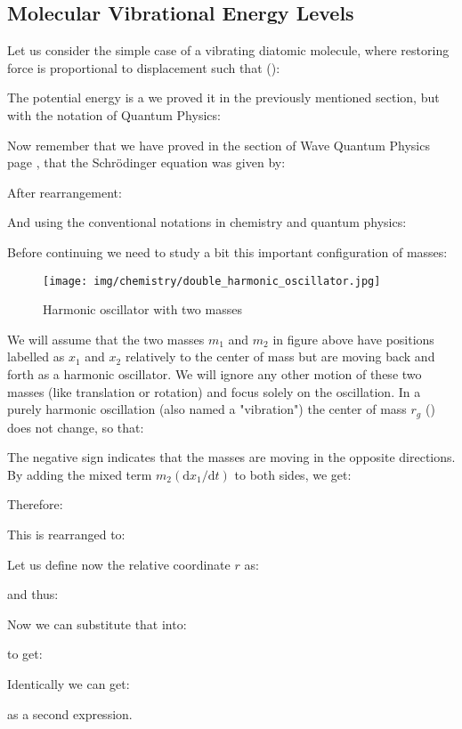 	\pagebreak
	\subsection{Molecular Vibrational Energy Levels}\label{molecular vibrations}
	Let us consider the simple case of a vibrating diatomic molecule, where restoring force is proportional to displacement such that ():
	
	The potential energy is a we proved it in the previously mentioned section, but with the notation of Quantum Physics:
	
	Now remember that we have proved in the section of Wave Quantum Physics page \pageref{schrodinger wave equation}, that the Schrödinger equation was given by:
	
	After rearrangement:
	
	And using the conventional notations in chemistry and quantum physics:
	
	Before continuing we need to study a bit this important configuration of masses:
	\begin{figure}[H]
		\centering
		\texttt{[image: img/chemistry/double\_harmonic\_oscillator.jpg]}
		\caption{Harmonic oscillator with two masses}
	\end{figure}
		We will assume that the two masses $m_1$ and $m_2$ in figure above have positions labelled as $x_1$ and $x_2$ relatively to the center of mass but are moving back and forth as a harmonic oscillator. We will ignore any other motion of these two masses (like translation or rotation) and focus solely on the oscillation. In a purely harmonic oscillation (also named a "vibration") the center of mass $r_g$ () does not change, so that:
	
	The negative sign indicates that the masses are moving in the opposite directions. By adding the mixed term $m_2(\mathrm{d}x_1/\mathrm{d}t)$ to both sides, we get:
	
	Therefore:
	
	This is rearranged to:
	
	Let us define now the relative coordinate $r$ as:
	
	and thus:
	
	Now we can substitute that into:
	
	to get:
	
	Identically we can get:
	
	as a second expression.
	

